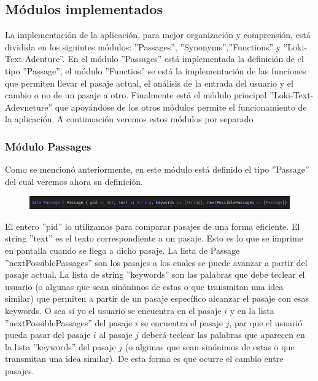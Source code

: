 \documentclass[12pt]{article}
\begin{document}
\subsection{M\'odulos implementados}

La implementaci\'on de la aplicaci\'on, para mejor organizaci\'on y comprensi\'on, est\'a dividida en los siguintes m\'odulos: ''Passages'', ''Synonyms'',''Functions'' y ''Loki-Text-Adenture''. En el m\'odulo ''Passages'' est\'a implementada la definici\'on de el tipo ''Passage'', el m\'odulo ''Functios'' se est\'a la implementaci\'on de las funciones que permiten llevar el pasaje actual, el an\'alisis de la entrada del usuario y el cambio o no de un pasaje a otro. Finalmente est\'a el m\'odulo principal ''Loki-Text-Adevneture'' que apoy\'andose de los otros m\'odulos permite el funcionamiento de la aplicaci\'on. A continuaci\'on veremos estos m\'odulos por separado 

\subsubsection{M\'odulo Passages}

Como se mencion\'o anteriormente, en este m\'odulo est\'a definido el tipo ''Passage'' del cual veremos ahora su definici\'on.

\begin{figure}[h]
	\begin{center}
		\includegraphics[width =15.0cm]{./img/Passage.png}
	\end{center}
\end{figure}

El entero ''pid'' lo utilizamos para comparar pasajes de una forma eficiente. El string ''text'' es el texto correspondiente a un pasaje. Esto es lo que se imprime en pantalla cuando se llega a dicho pasaje. La lista de Passage ''nextPossiblePassages'' son los pasajes a los cuales se puede avanzar a partir del pasaje actual. La lista de string ''keywords'' son las palabras que debe teclear el usuario (o algunas que sean sin\'onimos de estas o que transmitan una idea similar) que permiten a partir de un pasaje espec\'ifico alcanzar el pasaje con esas keywords. O sea si yo el usuario se encuentra en el pasaje $i$ y en la lista ''nextPossiblePassages'' del pasaje $i$ se encuentra el pasaje $j$, par que el usuari\'o pueda pasar del pasaje $i$ al pasaje $j$ deber\'a teclear las palabras que aparecen en la lista ''keywords'' del pasaje $j$ (o algunas que sean sin\'onimos de estas o que transmitan una idea similar). De esta forma es que ocurre el cambio entre pasajes.
\end{document}
